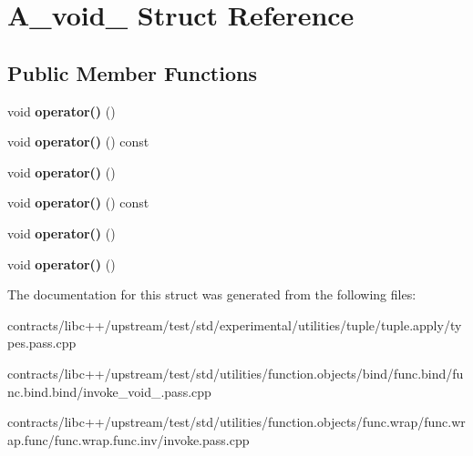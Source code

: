 \hypertarget{struct_a__void__0}{}\section{A\+\_\+void\+\_ Struct Reference}
\label{struct_a__void__0}
\subsection*{Public Member Functions}
\begin{DoxyCompactItemize}
\item 
\mbox{\label{struct_a__void__0_ab733a9a60e5d9c54f1dcd008b9996c2f}} 
void {\bfseries operator()} ()
\item 
\mbox{\label{struct_a__void__0_a32eb6457b41c7c12ec34b8f59460fa93}} 
void {\bfseries operator()} () const
\item 
\mbox{\label{struct_a__void__0_ab733a9a60e5d9c54f1dcd008b9996c2f}} 
void {\bfseries operator()} ()
\item 
\mbox{\label{struct_a__void__0_a32eb6457b41c7c12ec34b8f59460fa93}} 
void {\bfseries operator()} () const
\item 
\mbox{\label{struct_a__void__0_ab733a9a60e5d9c54f1dcd008b9996c2f}} 
void {\bfseries operator()} ()
\item 
\mbox{\label{struct_a__void__0_ab733a9a60e5d9c54f1dcd008b9996c2f}} 
void {\bfseries operator()} ()
\end{DoxyCompactItemize}


The documentation for this struct was generated from the following files\+:\begin{DoxyCompactItemize}
\item 
contracts/libc++/upstream/test/std/experimental/utilities/tuple/tuple.\+apply/types.\+pass.\+cpp\item 
contracts/libc++/upstream/test/std/utilities/function.\+objects/bind/func.\+bind/func.\+bind.\+bind/invoke\+\_\+void\+\_.\+pass.\+cpp\item 
contracts/libc++/upstream/test/std/utilities/function.\+objects/func.\+wrap/func.\+wrap.\+func/func.\+wrap.\+func.\+inv/invoke.\+pass.\+cpp\end{DoxyCompactItemize}
